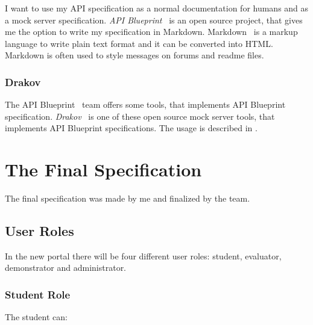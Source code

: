 I want to use my API specification as a normal documentation for humans and as a mock server specification. \emph{API Blueprint}~\cite{api-blueprint} is an open source project, that gives me the option to write my specification in Markdown. Markdown~\cite{markdown} is a markup language to write plain text format and it can be converted into HTML. Markdown is often used to style messages on forums and readme files. 

\subsubsection{Drakov}

The API Blueprint~\cite{api-blueprint} team offers some tools, that implements API Blueprint specification. \emph{Drakov}~\cite{drakov} is one of these open source mock server tools, that implements API Blueprint specifications. The usage is described in .

\section{The Final Specification} \label{final-spec}
The final specification was made by me and finalized by the team.
\subsection{User Roles}

In the new portal there will be four different user roles: student, evaluator, demonstrator and administrator. 

\subsubsection{Student Role}

The student can:

